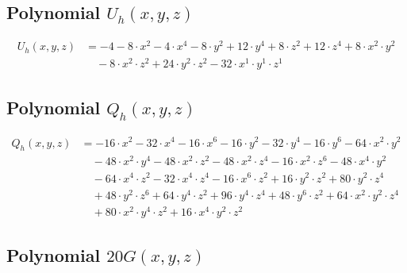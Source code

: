 \subsection{Polynomial $U_h(x,y,z)$}
\begin{align*}U_h(x,y,z)&=-4-8\cdot x^{2}-4\cdot x^{4}-8\cdot y^{2}+12\cdot y^{4}+8\cdot z^{2}+12\cdot z^{4}+8\cdot x^{2}\cdot y^{2}\\
&\quad -8\cdot x^{2}\cdot z^{2}+24\cdot y^{2}\cdot z^{2}-32\cdot x^{1}\cdot y^{1}\cdot z^{1}\end{align*}\subsection{Polynomial $Q_h(x,y,z)$}
\begin{align*}Q_h(x,y,z)&=-16\cdot x^{2}-32\cdot x^{4}-16\cdot x^{6}-16\cdot y^{2}-32\cdot y^{4}-16\cdot y^{6}-64\cdot x^{2}\cdot y^{2}\\
&\quad -48\cdot x^{2}\cdot y^{4}-48\cdot x^{2}\cdot z^{2}-48\cdot x^{2}\cdot z^{4}-16\cdot x^{2}\cdot z^{6}-48\cdot x^{4}\cdot y^{2}\\
&\quad -64\cdot x^{4}\cdot z^{2}-32\cdot x^{4}\cdot z^{4}-16\cdot x^{6}\cdot z^{2}+16\cdot y^{2}\cdot z^{2}+80\cdot y^{2}\cdot z^{4}\\
&\quad +48\cdot y^{2}\cdot z^{6}+64\cdot y^{4}\cdot z^{2}+96\cdot y^{4}\cdot z^{4}+48\cdot y^{6}\cdot z^{2}+64\cdot x^{2}\cdot y^{2}\cdot z^{4}\\
&\quad +80\cdot x^{2}\cdot y^{4}\cdot z^{2}+16\cdot x^{4}\cdot y^{2}\cdot z^{2}\end{align*}\subsection{Polynomial $20G(x,y,z)$}
